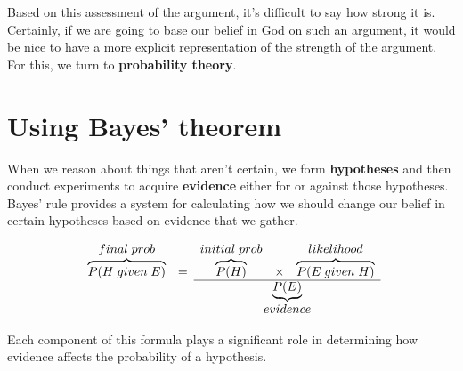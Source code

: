 \documentclass[letterpaper,10pt]{article}
\begin{document}
Based on this assessment of the argument, it's difficult to say how strong it is. Certainly, if we are going to base our belief in God on such an argument, it would be nice to have a more explicit representation of the strength of the argument. For this, we turn to \textbf{probability theory}.

\section{Using Bayes' theorem}

When we reason about things that aren't certain, we form \textbf{hypotheses} and then conduct experiments to acquire \textbf{evidence} either for or against those hypotheses. Bayes' rule provides a system for calculating how we should change our belief in certain hypotheses based on evidence that we gather.

\[\begin{array}{ccccc}
final \; prob & & initial \; prob & & likelihood \\
\overbrace{P(H\; given\; E)} & = & \overbrace{P(H)} & \times & \overbrace{P(E\; given\; H)} \\ \cline{3-5}
 & & \multicolumn{3}{c}{\underbrace{P(E)}} \\
 & & \multicolumn{3}{c}{evidence} \\
  \end{array}\]
  
Each component of this formula plays a significant role in determining how evidence affects the probability of a hypothesis.
\end{document}
